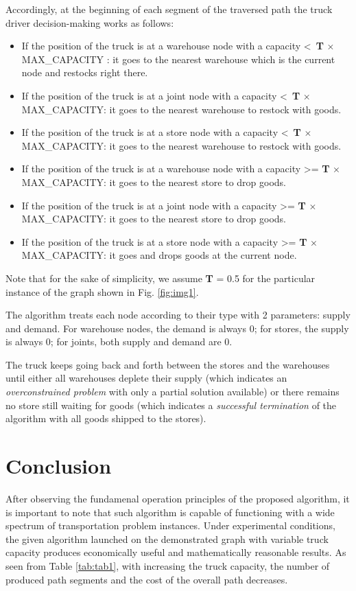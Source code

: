 \documentclass[journal,onecolumn]{IEEEtran}
\begin{document}
Accordingly, at the beginning of each segment of the traversed path the truck driver decision-making works as follows:
\begin{itemize}
    \item{If the position of the truck is at a warehouse node with a capacity \textless  \ \textbf{T} $ \times $ MAX\_CAPACITY : it goes to the nearest warehouse which is the current node and restocks right there.}
    \item{If the position of the truck is at a joint node with a capacity \textless \ \textbf{T} $ \times $ MAX\_CAPACITY: it goes to the nearest warehouse to restock with goods.}
    \item{If the position of the truck  is at a store node with a capacity \textless  \ \textbf{T} $ \times $ MAX\_CAPACITY: it goes to the nearest warehouse to restock with goods.}
   \item{If the position of the truck is at a warehouse node with a capacity \textgreater= \textbf{T} $ \times $ MAX\_CAPACITY: it goes to the nearest store to drop goods.}
   \item{If the position of the truck is at a joint node with a capacity \textgreater= \textbf{T} $ \times $ MAX\_CAPACITY: it goes to the nearest store to drop goods.}
   \item{If the position of the truck is at a store node with a capacity \textgreater= \textbf{T} $ \times $ MAX\_CAPACITY: it goes and drops goods at the current node.}  
\end{itemize}

Note that for the sake of simplicity, we assume \textbf{T} = 0.5 for the particular instance of the graph shown in Fig. \ref{fig:img1}.

The algorithm treats each node according to their type with 2 parameters: supply and demand. For warehouse nodes, the demand is always 0; for stores, the supply is always 0; for joints, both supply and demand are 0. 

The truck keeps going back and forth between the stores and the warehouses until either all warehouses deplete their supply (which indicates an \textit{overconstrained problem} with only a partial solution available) or there remains no store still waiting for goods (which indicates a \textit{successful termination} of the algorithm with all goods shipped to the stores).


\section{Conclusion}
After observing the fundamenal operation principles of the proposed algorithm, it is important to note that such algorithm is capable of functioning with a wide spectrum of transportation problem instances. Under experimental conditions, the given algorithm launched on the demonstrated graph  with variable truck capacity produces economically useful and mathematically reasonable results. As seen from Table \ref{tab:tab1}, with increasing the truck capacity, the number of produced path segments and the cost of the overall path decreases.
 
\end{document}
